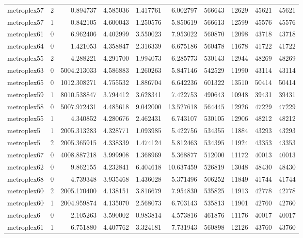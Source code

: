 \documentclass[../../../thesis.tex]{subfiles}
\begin{document}
\begin{longtable}{|l|r|r|r|r|r|r|r|r|r|}
metroplex57 & 2 & 0.894737 & 4.585036 & 1.417761 & 6.002797 & 566643 & 12629 & 45621 & 45621 \\
metroplex57 & 1 & 0.842105 & 4.600043 & 1.250576 & 5.850619 & 566613 & 12599 & 45576 & 45576 \\
metroplex61 & 0 & 6.962406 & 4.402999 & 3.550023 & 7.953022 & 560870 & 12098 & 43718 & 43718 \\
metroplex64 & 0 & 1.421053 & 4.358847 & 2.316339 & 6.675186 & 560478 & 11678 & 41722 & 41722 \\
metroplex55 & 2 & 4.288221 & 4.291700 & 1.994073 & 6.285773 & 530143 & 12944 & 48269 & 48269 \\
metroplex63 & 0 & 5004.213033 & 4.586883 & 1.260263 & 5.847146 & 542529 & 11990 & 43114 & 43114 \\
metroplex65 & 0 & 1012.308271 & 4.755532 & 1.886704 & 6.642236 & 601322 & 13510 & 50414 & 50414 \\
metroplex59 & 1 & 8010.538847 & 3.794412 & 3.628341 & 7.422753 & 490643 & 10948 & 39431 & 39431 \\
metroplex58 & 0 & 5007.972431 & 4.485618 & 9.042000 & 13.527618 & 564445 & 12926 & 47229 & 47229 \\
metroplex55 & 1 & 4.340852 & 4.280676 & 2.462431 & 6.743107 & 530105 & 12906 & 48212 & 48212 \\
metroplex5 & 1 & 2005.313283 & 4.328771 & 1.093985 & 5.422756 & 534355 & 11884 & 43293 & 43293 \\
metroplex5 & 2 & 2005.365915 & 4.338339 & 1.474124 & 5.812463 & 534395 & 11924 & 43353 & 43353 \\
metroplex67 & 0 & 4008.887218 & 3.999908 & 1.368969 & 5.368877 & 512000 & 11172 & 40013 & 40013 \\
metroplex62 & 0 & 9.862155 & 4.232841 & 6.404618 & 10.637459 & 526819 & 13048 & 48430 & 48430 \\
metroplex68 & 0 & 4.739348 & 3.935468 & 1.436028 & 5.371496 & 506252 & 11849 & 41744 & 41744 \\
metroplex60 & 2 & 2005.170400 & 4.138151 & 3.816679 & 7.954830 & 535825 & 11913 & 42778 & 42778 \\
metroplex60 & 1 & 2004.959874 & 4.135070 & 2.568073 & 6.703143 & 535813 & 11901 & 42760 & 42760 \\
metroplex6 & 0 & 2.105263 & 3.590002 & 0.983814 & 4.573816 & 461876 & 11176 & 40017 & 40017 \\
metroplex61 & 1 & 6.751880 & 4.407762 & 3.324181 & 7.731943 & 560898 & 12126 & 43760 & 43760 \\

\end{longtable}
\end{document}
